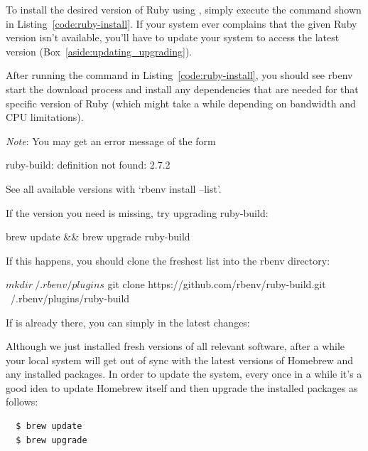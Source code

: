 To install the desired version of Ruby using , simply execute the command shown in Listing~\ref{code:ruby-install}. If your system ever complains that the given Ruby version isn't available, you'll have to update your system to access the latest version (Box~\ref{aside:updating_upgrading}).


\noindent After running the command in Listing~\ref{code:ruby-install}, you should see rbenv start the download process and install any dependencies that are needed for that specific version of Ruby (which might take a while depending on bandwidth and CPU limitations).

\emph{Note}: You may get an error message of the form

\begin{code}
ruby-build: definition not found: 2.7.2

See all available versions with `rbenv install --list'.

If the version you need is missing, try upgrading ruby-build:

  brew update && brew upgrade ruby-build
\end{code}

\noindent If this happens, you should clone the freshest  list into the rbenv  directory:

\begin{code}
$ mkdir ~/.rbenv/plugins
$ git clone https://github.com/rbenv/ruby-build.git ~/.rbenv/plugins/ruby-build
\end{code}

\noindent If  is already there, you can simply  in the latest changes:


\begin{aside}
\label{aside:updating_upgrading}

Although we just installed fresh versions of all relevant software, after a while your local system will get out of sync with the latest versions of Homebrew and any installed packages. In order to update the system, every once in a while it's a good idea to update Homebrew itself and then upgrade the installed packages as follows:

\begin{verbatim}
  $ brew update
  $ brew upgrade
\end{verbatim}

\end{aside}

